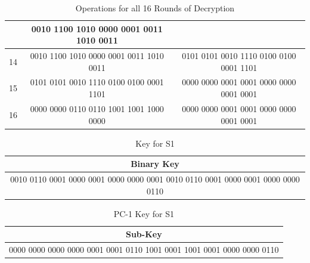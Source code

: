 \documentclass[12pt, letterpaper]{article}
\begin{document}
\begin{table}[ht]
\begin{tabular}{|c|c|c|}
 & 0010 1100 1010 0000 0001 0011 1010 0011 \\
         \hline
    14 & 0010 1100 1010 0000 0001 0011 1010 0011 & 0101 0101 0010 1110 0100 0100 0001 1101

  \\
         \hline
    15 & 0101 0101 0010 1110 0100 0100 0001 1101

 & 0000 0000 0001 0001 0000 0000 0001 0001

  \\
         \hline
    16 &   0000 0000 0110 0110 1001 1001 1000 0000

 & 0000 0000 0001 0001 0000 0000 0001 0001

  \\
    \hline
  \end{tabular}
    \caption{Operations for all 16 Rounds of Decryption}

    

\end{table}

\begin{table}[h]
    \centering
    \begin{tabular}{|c|}
        \hline
          Binary Key \\
        \hline
        0010 0110 0001 0000 0001 0000 0000 0001 0010 0110 0001 0000 0001 0000 0000 0110  \\
        \hline
    \end{tabular}
    \caption{Key for S1}
    \label{tab:text-key}
\end{table}

\begin{table}[h]
    \centering
    \begin{tabular}{|c|}
        \hline
          Sub-Key\\
        \hline
        0000 0000 0000 0000 0001 0001 0110 1001 0001 1001 0001 0000 0000 0110 \\
        \hline
    \end{tabular}
    \caption{PC-1 Key for S1}
    \label{tab:text-key}
\end{table}
\end{document}

